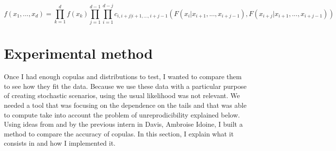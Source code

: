 \documentclass{article}
\begin{document}
	\begin{equation*}
		f(x_1,...,x_d)= \prod_{k=1}^d f(x_k) \prod_{j=1}^{d-1} \prod_{i=1}^{d-j} c_{i,i+j|i+1,...,i+j-1}(F(x_i|x_{i+1},...,x_{i+j-1}),F(x_{i+j}|x_{i+1},...,x_{i+j-1}))
	\end{equation*}
	

\newpage

\section{Experimental method}
\label{sec:method}


	Once I had enough copulas and distributions to test, I wanted to compare them to see how they fit the data. Because we use these data with a particular purpose of creating stochastic scenarios, using the usual likelihood was not relevant. We needed a tool that was focusing on the dependence on the tails and that was able to compute take into account the problem of unreprodicibility explained below. Using ideas from \cite{kendallfunction} and by the previous intern in Davis, Ambroise Idoine, I built a method to compare the accuracy of copulas. In this section, I explain what it consists in and how I implemented it.
	
\end{document}
